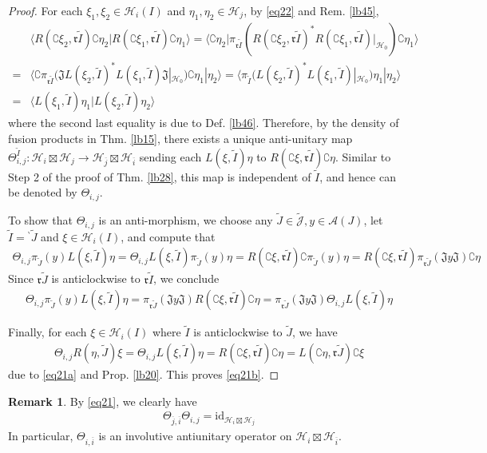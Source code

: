 \documentclass[11pt,b5paper,notitlepage]{article}
\theoremstyle{definition}
\newtheorem{rem}[df]{Remark}
\theoremstyle{plain}
\newcommand{\fk}{\mathfrak}
\newcommand{\wtd}{\widetilde}
\newcommand{\ovl}{\overline}
\newcommand{\id}{\mathrm{id}}
\newcommand{\bk}[1]{\langle {#1}\rangle}
\newcommand{\Jtd}{\widetilde{\mathcal J}}
\newcommand{\Co}{\complement}
\newcommand{\bpr}{{}^\backprime}
\newcommand{\rk}{\mathfrak r}
\newcommand{\MA}{\mathcal A}
\newcommand{\MH}{\mathcal H}
\numberwithin{equation}{section}
\begin{document}
\begin{proof}
For each $\xi_1,\xi_2\in\MH_i(I)$ and $\eta_1,\eta_2\in\MH_j$, by \eqref{eq22} and Rem. \ref{lb45},
\begin{align*}
&\bk{R(\Co\xi_2,\rk\wtd I)\Co\eta_2|R(\Co\xi_1,\rk\wtd I)\Co\eta_1}=\bk{\Co\eta_2|\pi_{\rk\wtd I}(R(\Co\xi_2,\rk\wtd I)^*R(\Co\xi_1,\rk\wtd I)|_{\MH_0})\Co\eta_1}\\
=&\bk{\Co\pi_{\rk\wtd I}(\fk JL(\xi_2,\wtd I)^*L(\xi_1,\wtd I)\fk J|_{\MH_0})\Co\eta_1|\eta_2}=\bk{\pi_{\wtd I}(L(\xi_2,\wtd I)^*L(\xi_1,\wtd I)|_{\MH_0})\eta_1|\eta_2}\\
=&\bk{L(\xi_1,\wtd I)\eta_1|L(\xi_2,\wtd I)\eta_2}
\end{align*}
where the second last equality is due to Def. \ref{lb46}. Therefore, by the density of fusion products in Thm. \ref{lb15}, there exists a unique anti-unitary map $\Theta_{i,j}^{\wtd I}:\MH_i\boxtimes\MH_j\rightarrow\MH_{\ovl j}\boxtimes\MH_{\ovl i}$ sending each $L(\xi,\wtd I)\eta$ to $R(\Co\xi,\rk\wtd I)\Co\eta$. Similar to Step 2 of the proof of Thm. \ref{lb28}, this map is independent of $\wtd I$, and hence can be denoted by $\Theta_{i,j}$.

To show that $\Theta_{i,j}$ is an anti-morphism, we choose any $\wtd J\in\Jtd,y\in\MA(J)$, let $\wtd I=\bpr\wtd J$ and $\xi\in\MH_i(I)$, and compute that
\begin{align*}
\Theta_{i,j}\pi_{\wtd J}(y)L(\xi,\wtd I)\eta=\Theta_{i,j}L(\xi,\wtd I)\pi_{\wtd J}(y)\eta=R(\Co\xi,\rk\wtd I)\Co\pi_{\wtd J}(y)\eta=R(\Co\xi,\rk\wtd I)\pi_{\rk\wtd J}(\fk Jy\fk J)\Co\eta
\end{align*}
Since $\rk\wtd J$ is anticlockwise to $\rk\wtd I$, we conclude
\begin{align*}
\Theta_{i,j}\pi_{\wtd J}(y)L(\xi,\wtd I)\eta=\pi_{\rk\wtd J}(\fk Jy\fk J)R(\Co\xi,\rk\wtd I)\Co\eta=\pi_{\rk\wtd J}(\fk Jy\fk J)\Theta_{i,j}L(\xi,\wtd I)\eta
\end{align*}

Finally, for each $\xi\in\MH_i(I)$ where $\wtd I$ is anticlockwise to $\wtd J$, we have
\begin{align*}
\Theta_{i,j}R(\eta,\wtd J)\xi=\Theta_{i,j}L(\xi,\wtd I)\eta=R(\Co\xi,\rk\wtd I)\Co\eta=L(\Co\eta,\rk\wtd J)\Co\xi
\end{align*}
due to \eqref{eq21a} and Prop. \ref{lb20}. This proves \eqref{eq21b}.
\end{proof}


\begin{rem}\label{lb81}
By \eqref{eq21}, we clearly have
\begin{align*}
\Theta_{\ovl j,\ovl i}\Theta_{i,j}=\id_{\MH_i\boxtimes\MH_j}
\end{align*}
In particular, $\Theta_{i,\ovl i}$ is an involutive antiunitary operator on $\MH_i\boxtimes\MH_{\ovl i}$.
\end{rem}
\end{document}
